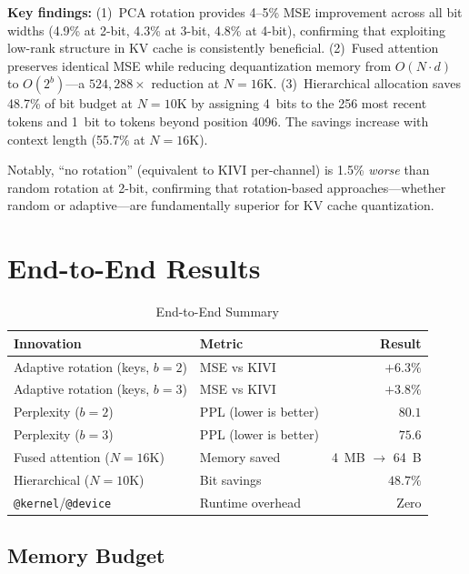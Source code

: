 \documentclass[10pt,twocolumn]{article}
\begin{document}
\textbf{Key findings:} (1)~PCA rotation provides 4--5\% MSE improvement across all bit widths (4.9\% at 2-bit, 4.3\% at 3-bit, 4.8\% at 4-bit), confirming that exploiting low-rank structure in KV cache is consistently beneficial. (2)~Fused attention preserves identical MSE while reducing dequantization memory from $O(N \!\cdot\! d)$ to $O(2^b)$---a $524{,}288\times$ reduction at $N{=}16$K. (3)~Hierarchical allocation saves 48.7\% of bit budget at $N{=}10$K by assigning 4~bits to the 256 most recent tokens and 1~bit to tokens beyond position 4096. The savings increase with context length (55.7\% at $N{=}16$K).

Notably, ``no rotation'' (equivalent to KIVI per-channel) is 1.5\% \textit{worse} than random rotation at 2-bit, confirming that rotation-based approaches---whether random or adaptive---are fundamentally superior for KV cache quantization.

\section{End-to-End Results}

\begin{table}[t]
\centering
\caption{End-to-End Summary}
\label{tab:e2e}
\begin{tabular}{llr}
\toprule
Innovation & Metric & Result \\
\midrule
Adaptive rotation (keys, $b{=}2$) & MSE vs KIVI & $+6.3\%$ \\
Adaptive rotation (keys, $b{=}3$) & MSE vs KIVI & $+3.8\%$ \\
Perplexity ($b{=}2$) & PPL (lower is better) & $\mathbf{80.1}$ \\
Perplexity ($b{=}3$) & PPL (lower is better) & $\mathbf{75.6}$ \\
Fused attention ($N{=}16$K) & Memory saved & 4~MB $\to$ 64~B \\
Hierarchical ($N{=}10$K) & Bit savings & $\mathbf{48.7\%}$ \\
\texttt{@kernel}/\texttt{@device} & Runtime overhead & Zero \\
\bottomrule
\end{tabular}
\end{table}

\subsection{Memory Budget}
\end{document}
